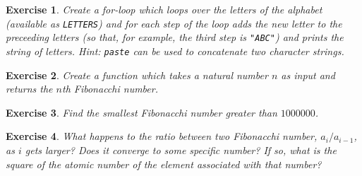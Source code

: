 \documentclass{article}\usepackage[]{graphicx}\usepackage[]{color}
\newtheorem{exercise}{Exercise}[section]
\begin{document}
\begin{exercise}
Create a for-loop which loops over the letters of the alphabet (available as \texttt{LETTERS}) and for each step of the loop adds the new letter to the preceeding letters (so that, for example, the third step is \texttt{"ABC"}) and prints the string of letters. Hint: \texttt{paste} can be used to concatenate two character strings.
\end{exercise}

\begin{exercise}
Create a function which takes a natural number $n$ as input and returns the $n$th Fibonacchi number. 
\end{exercise}

\begin{exercise}
Find the smallest Fibonacchi number greater than $1 000 000$.
\end{exercise}

\begin{exercise}
What happens to the ratio between two Fibonacchi number, $a_i/a_{i-1}$, as $i$ gets larger? Does it converge to some specific number? If so, what is the square of the atomic number of the element associated with that number?
\end{exercise}
\end{document}
